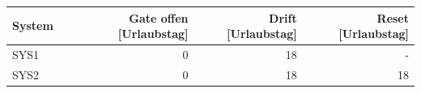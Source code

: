 \begin{tabular}{lrrr}
\toprule
System & Gate offen [Urlaubstag] & Drift [Urlaubstag] & Reset [Urlaubstag] \\
\midrule
SYS1 & 0 & 18 & - \\
SYS2 & 0 & 18 & 18 \\
\bottomrule
\end{tabular}
